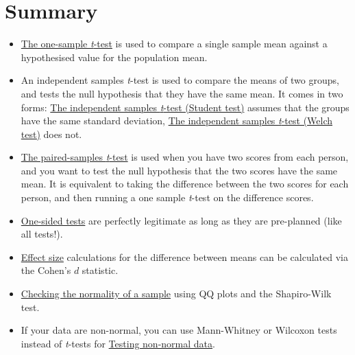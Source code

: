 \documentclass[
  a4paper,
]{book}
\providecommand{\tightlist}{%
  \setlength{\itemsep}{0pt}\setlength{\parskip}{0pt}}\usepackage{longtable,booktabs,array}
\begin{document}
\hypertarget{summary-9}{%
\section{Summary}\label{summary-9}}

\begin{itemize}
\tightlist
\item
  \protect\hyperlink{sec-The-one-sample-t-test}{The one-sample
  \emph{t}-test} is used to compare a single sample mean against a
  hypothesised value for the population mean.
\item
  An independent samples \emph{t}-test is used to compare the means of
  two groups, and tests the null hypothesis that they have the same
  mean. It comes in two forms:
  \protect\hyperlink{sec-the-independent-samples-t-test-student-test}{The
  independent samples \emph{t}-test (Student test)} assumes that the
  groups have the same standard deviation,
  \protect\hyperlink{sec-the-independent-samples-t-test-welch-test}{The
  independent samples \emph{t}-test (Welch test)} does not.
\item
  \protect\hyperlink{the-paired-samples-t-test}{The paired-samples
  \emph{t}-test} is used when you have two scores from each person, and
  you want to test the null hypothesis that the two scores have the same
  mean. It is equivalent to taking the difference between the two scores
  for each person, and then running a one sample \emph{t}-test on the
  difference scores.
\item
  \protect\hyperlink{one-sided-tests}{One-sided tests} are perfectly
  legitimate as long as they are pre-planned (like all tests!).
\item
  \protect\hyperlink{effect-size}{Effect size} calculations for the
  difference between means can be calculated via the Cohen's \(d\)
  statistic.
\item
  \protect\hyperlink{sec-Checking-the-normality-of-a-sample}{Checking
  the normality of a sample} using QQ plots and the Shapiro-Wilk test.
\item
  If your data are non-normal, you can use Mann-Whitney or Wilcoxon
  tests instead of \emph{t}-tests for
  \protect\hyperlink{testing-non-normal-data}{Testing non-normal data}.
\end{itemize}
\end{document}
